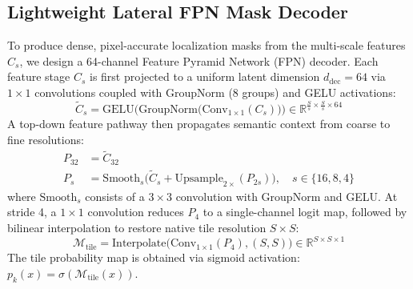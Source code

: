 \documentclass[sigconf,review=true]{acmart}
\begin{document}
\subsection{Lightweight Lateral FPN Mask Decoder}
To produce dense, pixel-accurate localization masks from the multi-scale features $C_s$, we design a 64-channel Feature Pyramid Network (FPN) decoder. Each feature stage $C_s$ is first projected to a uniform latent dimension $d_{\mathrm{dec}} = 64$ via $1 \times 1$ convolutions coupled with GroupNorm (8 groups) and GELU activations:
\begin{equation}
    \tilde{C}_s = \mathrm{GELU}\Big(\mathrm{GroupNorm}\big(\mathrm{Conv}_{1 \times 1}(C_s)\big)\Big) \in \mathbb{R}^{\frac{S}{s} \times \frac{S}{s} \times 64}
    \label{eq:lateral_proj}
\end{equation}
A top-down feature pathway then propagates semantic context from coarse to fine resolutions:
\begin{align}
    P_{32} &= \tilde{C}_{32} \\
    P_s &= \mathrm{Smooth}_s\Big(\tilde{C}_s + \mathrm{Upsample}_{2\times}(P_{2s})\Big), \quad s \in \{16, 8, 4\}
    \label{eq:fpn_topdown}
\end{align}
where $\mathrm{Smooth}_s$ consists of a $3 \times 3$ convolution with GroupNorm and GELU. At stride 4, a $1 \times 1$ convolution reduces $P_4$ to a single-channel logit map, followed by bilinear interpolation to restore native tile resolution $S \times S$:
\begin{equation}
    \mathcal{M}_{\mathrm{tile}} = \mathrm{Interpolate}\Big(\mathrm{Conv}_{1 \times 1}(P_4), (S, S)\Big) \in \mathbb{R}^{S \times S \times 1}
    \label{eq:tile_logits}
\end{equation}
The tile probability map is obtained via sigmoid activation: $p_k(x) = \sigma(\mathcal{M}_{\mathrm{tile}}(x))$.
\end{document}
